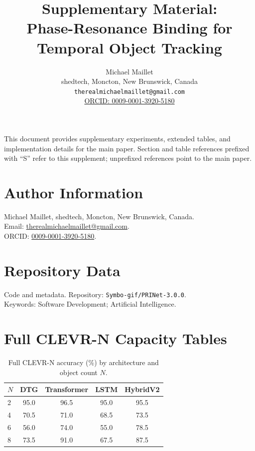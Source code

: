 \documentclass[11pt]{article}
\title{Supplementary Material:\\
Phase-Resonance Binding for Temporal Object Tracking}
\author{%
  Michael Maillet\\
  shedtech, Moncton, New Brunswick, Canada\\
  \texttt{therealmichaelmaillet@gmail.com}\\
  \href{https://orcid.org/0009-0001-3920-5180}{ORCID: 0009-0001-3920-5180}%
}
\date{}
\begin{document}
\maketitle

This document provides supplementary experiments, extended tables,
and implementation details for the main paper. Section and table
references prefixed with ``S'' refer to this supplement; unprefixed
references point to the main paper.

\section*{Author Information}
Michael Maillet, shedtech, Moncton, New Brunswick, Canada.\\
Email: \href{mailto:therealmichaelmaillet@gmail.com}{therealmichaelmaillet@gmail.com}.\\
ORCID: \href{https://orcid.org/0009-0001-3920-5180}{0009-0001-3920-5180}.

\section*{Repository Data}
Code and metadata. Repository: \texttt{Symbo-gif/PRINet-3.0.0}.\\
Keywords: Software Development; Artificial Intelligence.

\setcounter{section}{0}
\renewcommand{\thesection}{S\arabic{section}}
\renewcommand{\thetable}{S\arabic{table}}
\renewcommand{\thefigure}{S\arabic{figure}}

\section{Full CLEVR-N Capacity Tables}
\label{app:clevr_n}

\begin{table}[htbp]
\centering
\caption{Full CLEVR-N accuracy (\%) by architecture and object count $N$.}
\label{tab:clevr_n_full}
\begin{tabular}{lcccc}
\toprule
$N$ & DTG & Transformer & LSTM & HybridV2 \\
\midrule
2 & 95.0 & 96.5 & 95.0 & 95.5 \\
4 & 70.5 & 71.0 & 68.5 & 73.5 \\
6 & 56.0 & 74.0 & 55.0 & 78.5 \\
8 & 73.5 & 91.0 & 67.5 & 87.5 \\
\bottomrule
\end{tabular}
\end{table}
\end{document}
